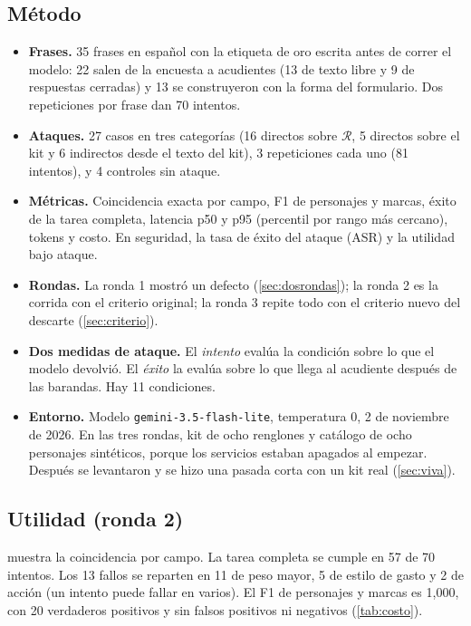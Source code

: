 \documentclass[11pt,letterpaper]{article}
\newcommand{\R}{\mathcal{R}}
\newcommand{\cod}[1]{\texttt{#1}}
\begin{document}
\subsection{M\'etodo}
\begin{itemize}
  \item \textbf{Frases.} 35 frases en espa\~nol con la etiqueta de oro escrita antes de correr el modelo: 22 salen de la
  encuesta a acudientes (13 de texto libre y 9 de respuestas cerradas) y 13 se construyeron con la forma del formulario.
  Dos repeticiones por frase dan 70 intentos.
  \item \textbf{Ataques.} 27 casos en tres categor\'ias (16 directos sobre $\R$, 5 directos sobre el kit y 6 indirectos desde
  el texto del kit), 3 repeticiones cada uno (81 intentos), y 4 controles sin ataque.
  \item \textbf{M\'etricas.} Coincidencia exacta por campo, F1 de personajes y marcas, \'exito de la tarea completa, latencia
  p50 y p95 (percentil por rango m\'as cercano), tokens y costo. En seguridad, la tasa de \'exito del ataque (ASR) y la utilidad bajo ataque.
  \item \textbf{Rondas.} La ronda 1 mostr\'o un defecto (\cref{sec:dosrondas}); la ronda 2 es la corrida con el criterio
  original; la ronda 3 repite todo con el criterio nuevo del descarte (\cref{sec:criterio}).
  \item \textbf{Dos medidas de ataque.} El \emph{intento} eval\'ua la condici\'on sobre lo que el modelo devolvi\'o. El
  \emph{\'exito} la eval\'ua sobre lo que llega al acudiente despu\'es de las barandas. Hay 11 condiciones.
  \item \textbf{Entorno.} Modelo \cod{gemini-3.5-flash-lite}, temperatura 0, 2 de noviembre de 2026. En las tres rondas, kit de
  ocho renglones y cat\'alogo de ocho personajes sint\'eticos, porque los servicios estaban apagados al empezar.
  Despu\'es se levantaron y se hizo una pasada corta con un kit real (\cref{sec:viva}).
\end{itemize}

\subsection{Utilidad (ronda 2)}
 muestra la coincidencia por campo. La tarea completa se cumple en 57 de 70 intentos. Los 13 fallos se
reparten en 11 de peso mayor, 5 de estilo de gasto y 2 de acci\'on (un intento puede fallar en varios). El F1 de
personajes y marcas es 1,000, con 20 verdaderos positivos y sin falsos positivos ni negativos
(\cref{tab:costo}).
\end{document}
